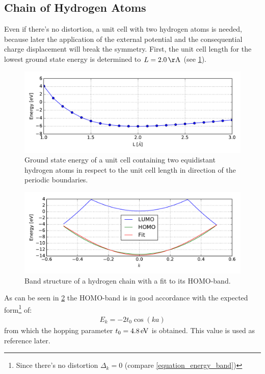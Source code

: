 \subsection{Chain of Hydrogen Atoms}
Even if there's no distortion, a unit cell with two hydrogen atoms is needed, because later the application of the external potential and the consequential charge displacement will break the symmetry. First, the unit cell length for the lowest ground state energy is determined to $L = \unit[2.0]{\AA}$ (see \cref{image_hydrogen_unit_cell_length}).
\begin{figure}
	\centering
	\includegraphics[width = 13cm]{Images/Hydrogen/convergence/hydrogen_length}
	\caption{Ground state energy of a unit cell containing two equidistant hydrogen atoms in respect to the unit cell length in direction of the periodic boundaries.}
	\label{image_hydrogen_unit_cell_length}
\end{figure}
\begin{figure}
	\centering
	\includegraphics[width = 13cm]{Images/Hydrogen/bands/hydrogen_band_structure}
	\caption{Band structure of a hydrogen chain with a fit to its HOMO-band.}
	\label{image_hydrogen_band_structure}
\end{figure}
As can be seen in \cref{image_hydrogen_band_structure} the HOMO-band is in good accordance with the expected form\footnote{Since there's no distortion $\Delta_k = 0$ (compare \cref{equation_energy_band})} of:
\begin{align}
	E_k = -2t_0\cos(ka)
\end{align}
from which the hopping parameter $t_0 = \unit[4.8]{eV}$ is obtained. This value is used as reference later.\\
